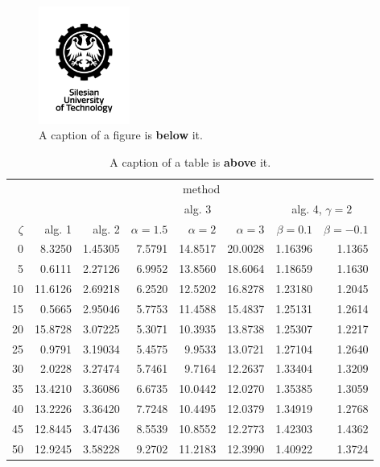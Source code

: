 \documentclass[a4paper,twoside,12pt]{book}
\begin{document}
\begin{figure}
\centering
\includegraphics[width=3cm]{logo_eng.jpg}
\caption{A caption of a figure is \textbf{below} it.}
\label{fig:2}
\end{figure}

\begin{table}
\centering
\caption{A caption of a table is \textbf{above} it.}
\label{id:tab:wyniki}
\begin{tabular}{rrrrrrrr}
\toprule
	         &                                     \multicolumn{7}{c}{method}                                      \\
	         \cmidrule{2-8}
	         &         &         &        \multicolumn{3}{c}{alg. 3}        & \multicolumn{2}{c}{alg. 4, $\gamma = 2$} \\
	         \cmidrule(r){4-6}\cmidrule(r){7-8}
	$\zeta$ &     alg. 1 &   alg. 2 & $\alpha= 1.5$ & $\alpha= 2$ & $\alpha= 3$ &   $\beta = 0.1$  &   $\beta = -0.1$ \\
\midrule
	       0 &  8.3250 & 1.45305 &       7.5791 &    14.8517 &    20.0028 & 1.16396 &                       1.1365 \\
	       5 &  0.6111 & 2.27126 &       6.9952 &    13.8560 &    18.6064 & 1.18659 &                       1.1630 \\
	      10 & 11.6126 & 2.69218 &       6.2520 &    12.5202 &    16.8278 & 1.23180 &                       1.2045 \\
	      15 &  0.5665 & 2.95046 &       5.7753 &    11.4588 &    15.4837 & 1.25131 &                       1.2614 \\
	      20 & 15.8728 & 3.07225 &       5.3071 &    10.3935 &    13.8738 & 1.25307 &                       1.2217 \\
	      25 &  0.9791 & 3.19034 &       5.4575 &     9.9533 &    13.0721 & 1.27104 &                       1.2640 \\
	      30 &  2.0228 & 3.27474 &       5.7461 &     9.7164 &    12.2637 & 1.33404 &                       1.3209 \\
	      35 & 13.4210 & 3.36086 &       6.6735 &    10.0442 &    12.0270 & 1.35385 &                       1.3059 \\
	      40 & 13.2226 & 3.36420 &       7.7248 &    10.4495 &    12.0379 & 1.34919 &                       1.2768 \\
	      45 & 12.8445 & 3.47436 &       8.5539 &    10.8552 &    12.2773 & 1.42303 &                       1.4362 \\
	      50 & 12.9245 & 3.58228 &       9.2702 &    11.2183 &    12.3990 & 1.40922 &                       1.3724 \\
\bottomrule
\end{tabular}
\end{table}  
\end{document}
